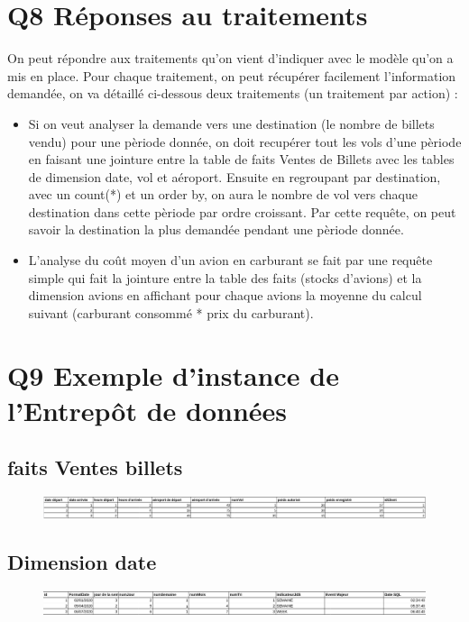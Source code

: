 \documentclass[oneside,13pt,a4paper]{article}
\begin{document}
\section{Q8 Réponses au traitements}

On peut répondre aux traitements qu'on vient d'indiquer avec le modèle qu'on a mis en place. Pour chaque traitement, on peut récupérer facilement l'information demandée, on va détaillé ci-dessous deux traitements (un traitement par action) : 
\begin{itemize}
  \item Si on veut analyser la demande vers une destination (le nombre de billets vendu) pour une pèriode donnée, on doit recupérer tout les vols d'une pèriode en faisant une jointure entre la table de faits Ventes de Billets avec les tables de dimension date, vol et aéroport. Ensuite en regroupant par destination, avec un count(*) et un order by, on aura le nombre de vol vers chaque destination dans cette pèriode par ordre croissant. Par cette requête, on peut savoir la destination la plus demandée pendant une pèriode donnée.
  \item L'analyse du coût moyen d'un avion en carburant se fait par une requête simple qui fait la jointure entre la table des faits (stocks d'avions) et la dimension avions en affichant pour chaque avions la moyenne du calcul suivant (carburant consommé * prix du carburant).
\end{itemize}



\section{Q9 Exemple d'instance de l'Entrepôt de données}

\subsection{faits Ventes billets}
\begin{figure}[h]
  \centering
  \includegraphics[width=1\textwidth]{img/faitsVentesBillets.png}
       
\end{figure}
\subsection{Dimension date}
\begin{figure}[h]
  \centering
  \includegraphics[width=1\textwidth]{img/date.png}
  
\end{figure}
\end{document}
